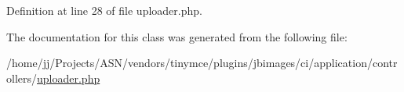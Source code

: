 Definition at line 28 of file uploader.\+php.



The documentation for this class was generated from the following file\+:\begin{DoxyCompactItemize}
\item 
/home/jj/\+Projects/\+A\+S\+N/vendors/tinymce/plugins/jbimages/ci/application/controllers/\hyperlink{uploader_8php}{uploader.\+php}\end{DoxyCompactItemize}
